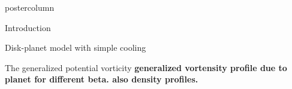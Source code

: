 \documentclass[final,hyperref={pdfpagelabels=false}]{beamer}
\newlength{\columnheight}
\begin{document}
\begin{frame}
\begin{columns}

    \begin{column}{.49\textwidth}
      \begin{beamercolorbox}[center,wd=\textwidth]{postercolumn}
        \begin{minipage}[T]{.95\textwidth}  %
          \parbox[t][\columnheight]{\textwidth}{ %
            \begin{block}{{\Large Introduction}}
              \justifying
                  {\large              
                    {\bf
                    }
                  }
            \end{block}
            \vfill
            
            \begin{block}{{\Large Disk-planet model with simple cooling}}
              
            \end{block}
            \vfill


            \begin{block}{{\Large The generalized potential vorticity}}
              \justifying
                  {\bf generalized vortensity profile due to planet for
                    different beta. also density profiles.}


\end{block}}
\end{minipage}
\end{beamercolorbox}
\end{column}
\end{columns}
\end{frame}
\end{document}
